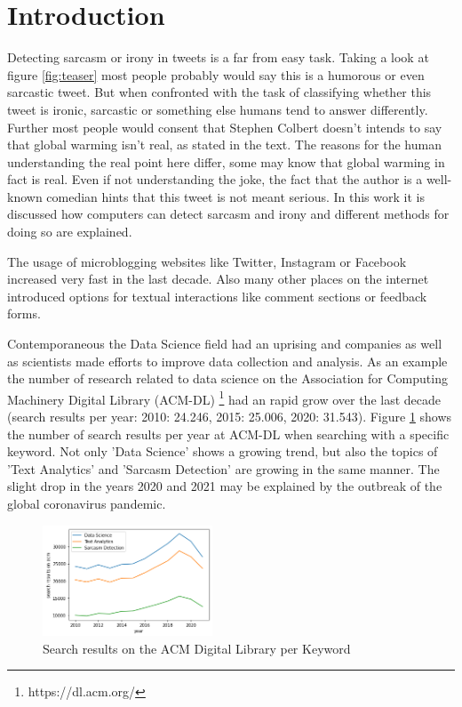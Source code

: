 \documentclass[sigconf,  review=false, nonacm=true]{acmart}
\begin{document}




\section{Introduction}
Detecting sarcasm or irony in tweets is a far from easy task. Taking a look at figure \ref{fig:teaser} most people probably would say this is a humorous or even sarcastic tweet. But when confronted with the task of classifying whether this tweet is ironic, sarcastic or something else humans tend to answer differently. Further most people would consent that Stephen Colbert doesn't intends to say that global warming isn't real, as stated in the text. The reasons for the human understanding the real point here differ, some may know that global warming in fact is real. Even if not understanding the joke, the fact that the author is a well-known comedian hints that this tweet is not meant serious. In this work it is discussed how computers can detect sarcasm and irony and different methods for doing so are explained.

The usage of microblogging websites like Twitter, Instagram or Facebook increased very fast in the last decade. Also many other places on the internet introduced options for textual interactions like comment sections or feedback forms.

Contemporaneous the Data Science field had an uprising and companies as well as scientists made efforts to improve data collection and analysis. As an example the number of research related to data science on the Association for Computing Machinery Digital Library (ACM-DL) \footnote{https://dl.acm.org/} had an rapid grow over the last decade (search results per year: 2010: 24.246, 2015: 25.006, 2020: 31.543). Figure \ref{fig:search_results} shows the number of search results per year at ACM-DL when searching with a specific keyword. Not only 'Data Science' shows a growing trend, but also the topics of 'Text Analytics' and 'Sarcasm Detection' are growing in the same manner. The slight drop in the years 2020 and 2021 may be explained by the outbreak of the global coronavirus pandemic.
\begin{figure}[h]
    \centering
    \includegraphics[width=0.45\textwidth]{./sources/search_results}
    \caption{Search results on the ACM Digital Library per Keyword}
    \label{fig:search_results}
\end{figure}
\end{document}
